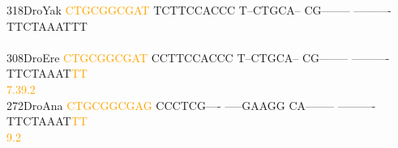 \documentclass[11pt,twoside,reqno,a4paper]{article}
\begin{document}
{318\hspace*{1\charwidth}DroYak	\textcolor{orange}{C}\textcolor{orange}{T}\textcolor{orange}{G}\textcolor{orange}{C}\textcolor{orange}{G}\textcolor{orange}{G}\textcolor{orange}{C}\textcolor{orange}{G}\textcolor{orange}{A}\textcolor{orange}{T}	TCTTCCACCC	T--CTGCA--	CG--------	----------	TTCTAAATTT	\\
\hspace*{4\charwidth}\hspace*{7\charwidth}\hspace*{1\charwidth}\hspace*{1\charwidth}\hspace*{1\charwidth}\hspace*{1\charwidth}\hspace*{1\charwidth}\hspace*{1\charwidth}\\
308\hspace*{1\charwidth}DroEre	\textcolor{orange}{C}\textcolor{orange}{T}\textcolor{orange}{G}\textcolor{orange}{C}\textcolor{orange}{G}\textcolor{orange}{G}\textcolor{orange}{C}\textcolor{orange}{G}\textcolor{orange}{A}\textcolor{orange}{T}	CCTTCCACCC	T--CTGCA--	CG--------	----------	TTCTAAAT\textcolor{orange}{T}\textcolor{orange}{T}	\\
\hspace*{4\charwidth}\hspace*{7\charwidth}\hspace*{0\charwidth}\textcolor{orange}{7.3}\hspace*{1\charwidth}\hspace*{1\charwidth}\hspace*{1\charwidth}\hspace*{1\charwidth}\hspace*{1\charwidth}\hspace*{55\charwidth}\textcolor{orange}{9.2}\hspace*{1\charwidth}\\
272\hspace*{1\charwidth}DroAna	\textcolor{orange}{C}\textcolor{orange}{T}\textcolor{orange}{G}\textcolor{orange}{C}\textcolor{orange}{G}\textcolor{orange}{G}\textcolor{orange}{C}\textcolor{orange}{G}\textcolor{orange}{A}\textcolor{orange}{G}	CCCTCG----	-----GAAGG	CA--------	----------	TTCTAAAT\textcolor{orange}{T}\textcolor{orange}{T}	\\
\hspace*{4\charwidth}\hspace*{7\charwidth}\hspace*{1\charwidth}\hspace*{1\charwidth}\hspace*{1\charwidth}\hspace*{1\charwidth}\hspace*{1\charwidth}\hspace*{58\charwidth}\textcolor{orange}{9.2}\hspace*{1\charwidth}\\
}
\end{document}
